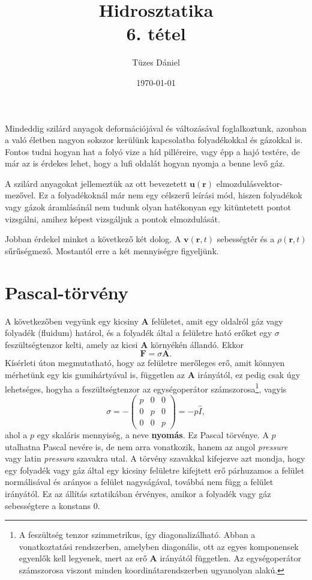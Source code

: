 \documentclass[12pt,a4paper]{scrartcl}
\title{Hidrosztatika\\{\small{6. tétel}}}
\author{Tüzes Dániel}
\date{\today}
\let\mathbf\bm
\begin{document}
\maketitle

Mindeddig szilárd anyagok deformációjával és változásával foglalkoztunk, azonban a való életben nagyon sokszor kerülünk kapcsolatba folyadékokkal és gázokkal is. Fontos tudni hogyan hat a folyó vize a híd pilléreire, vagy épp a hajó testére, de már az is érdekes lehet, hogy a lufi oldalát hogyan nyomja a benne levő gáz.

A szilárd anyagokat jellemeztük az ott bevezetett ${\mathbf{u}}\left( {\mathbf{r}} \right)$ elmozdulásvektor-mezővel. Ez a folyadékoknál már nem egy célszerű leírási mód, hiszen folyadékok vagy gázok áramlásánál nem tudunk olyan hatékonyan egy kitüntetett pontot vizsgálni, amihez képest vizsgáljuk a pontok elmozdulását.

Jobban érdekel minket a következő két dolog. A ${\mathbf{v}}\left( {{\mathbf{r}},t} \right)$ sebességtér és a $\rho \left( {{\mathbf{r}},t} \right)$ sűrűségmező. Mostantól erre a két mennyiségre figyeljünk.

\section{Pascal-törvény}

A következőben vegyünk egy kicsiny ${\mathbf{A}}$ felületet, amit egy oldalról gáz vagy folyadék (fluidum) határol, és a folyadék által a felületre ható erőket egy $\sigma$ feszültségtenzor kelti, amely az kicsi ${\mathbf{A}}$ környékén állandó. Ekkor 
\[{\mathbf{F}} = \sigma {\mathbf{A}}.\]
Kísérleti úton megmutatható, hogy az felületre merőleges erő, amit könnyen mérhetünk egy kis gumihártyával is, független az ${\mathbf{A}}$ irányától, ez pedig csak úgy lehetséges, hogyha a feszültségtenzor az egységoperátor számszorosa\footnote{A feszültség tenzor szimmetrikus, így diagonalizálható. Abban a vonatkoztatási rendszerben, amelyben diagonális, ott az egyes komponensek egyenlők kell legyenek, mert az erő ${\mathbf{A}}$ irányától független. Az egységoperátor számszorosa viszont minden koordinátarendszerben ugyanolyan alakú.}, vagyis
\begin{equation} \label{eq:pascal}
\sigma  =  - \left( {\begin{array}{*{20}{c}}
  p&0&0 \\ 
  0&p&0 \\ 
  0&0&p 
\end{array}} \right) =  - p\hat I,
\end{equation}
ahol a $p$ egy skaláris mennyiség, a neve \textbf{nyomás}. Ez Pascal törvénye. A $p$ utalhatna Pascal nevére is, de nem arra vonatkozik, hanem az angol \textit{pressure} vagy latin \textit{pressura} szavakra utal. A törvény szavakkal kifejezve azt mondja, hogy egy folyadék vagy gáz által egy kicsiny felületre kifejtett erő párhuzamos a felület normálisával és arányos a felület nagyságával, továbbá nem függ a felület irányától. Ez az állítás sztatikában érvényes, amikor a folyadék vagy gáz sebességtere a konstans 0.
\end{document}
